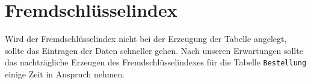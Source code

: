 \section*{Fremdschlüsselindex}
Wird der Fremdschlüsselindex nicht bei der Erzeugung der Tabelle angelegt, sollte das Eintragen der Daten schneller gehen. Nach unseren Erwartungen sollte das nachträgliche Erzeugen des Fremdschlüsselindexes für die Tabelle \texttt{Bestellung} einige Zeit in Anspruch nehmen.